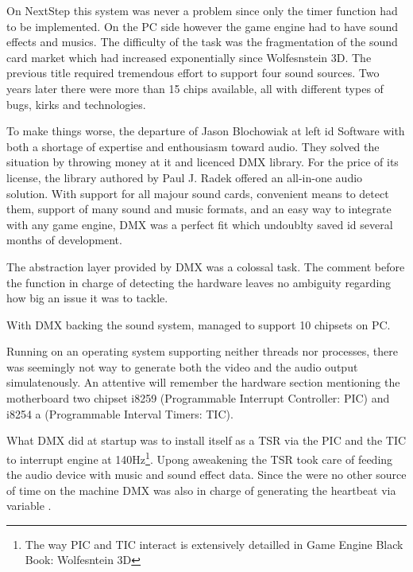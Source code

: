 On NextStep this system was never a problem since only the timer function had to be implemented. On the PC side however the game engine had to have sound effects and musics. The difficulty of the task was the fragmentation of the sound card market which had increased exponentially since Wolfesnstein 3D. The previous title required tremendous effort to support four sound sources. Two years later there were more than 15 chips available, all with different types of bugs, kirks and technologies.\\
\par
To make things worse, the departure of Jason Blochowiak  at left id Software with both a shortage of expertise and enthousiasm toward audio. They solved the situation by throwing money at it and licenced DMX library. For the price of its license, the library authored by Paul J. Radek offered an all-in-one audio solution. With support for all majour sound cards, convenient means to detect them, support of many sound and music formats, and an easy way to integrate with any game engine, DMX was a perfect fit which undoublty saved id several months of development.\\
\par
The abstraction layer provided by DMX was a colossal task. The comment before the function in charge of detecting the hardware leaves no ambiguity regarding how big an issue it was to tackle.\\
\par
{}
\par
With DMX backing the sound system, \doom managed to support 10 chipsets on PC.\\
\par
{}
\par
Running on an operating system supporting neither threads nor processes, there was seemingly not way to generate both the video and the audio output simulatenously. An attentive will remember the hardware section mentioning the motherboard two chipset i8259 (Programmable Interrupt Controller: PIC) and i8254 a (Programmable Interval Timers: TIC).\\
\par
What DMX did at startup was to install itself as a TSR via the PIC and the TIC to interrupt \doom engine at 140Hz\footnote{The way PIC and TIC interact is extensively detailled in Game Engine Black Book: Wolfesntein 3D}. Upong aweakening the TSR took care of feeding the audio device with music and sound effect data. Since the were no other source of time on the machine DMX was also in charge of generating the heartbeat via variable .
\par


